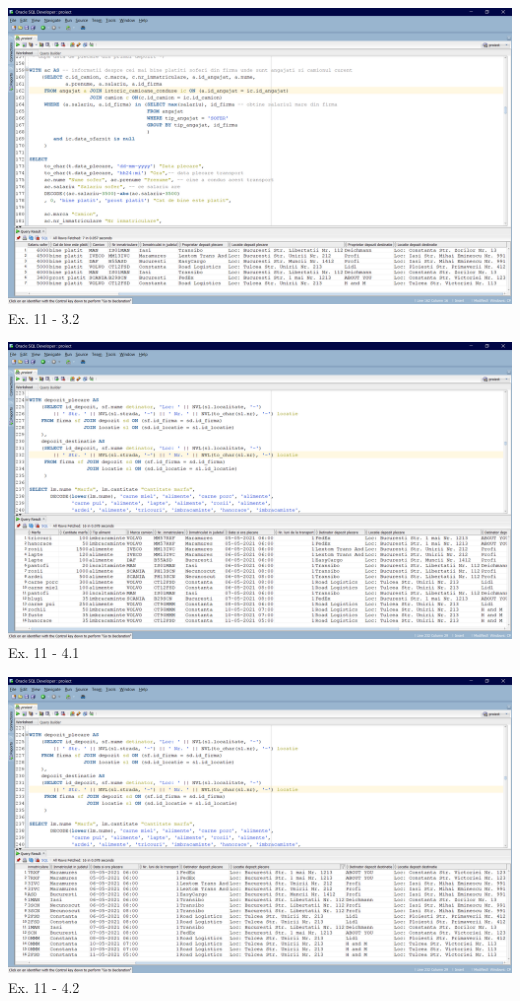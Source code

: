 \documentclass[12pt, a4paper]{article}
\begin{document}
\includegraphics[width=\textwidth]{ex11_3_2.png}
\label{Ex11 3.2}
\centering Ex. 11 - 3.2

\includegraphics[width=\textwidth]{ex11_4_1.png}
\label{Ex11 4.1}
\centering Ex. 11 - 4.1

\includegraphics[width=\textwidth]{ex11_4_2.png}
\label{Ex11 4.2}
\centering Ex. 11 - 4.2
\end{document}
